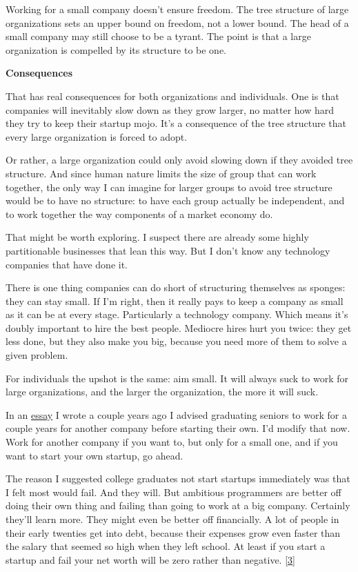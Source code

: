 Working for a small company doesn't ensure freedom. The tree structure
of large organizations sets an upper bound on freedom, not a lower
bound. The head of a small company may still choose to be a tyrant. The
point is that a large organization is compelled by its structure to be
one.

\textbf{Consequences}

That has real consequences for both organizations and individuals. One
is that companies will inevitably slow down as they grow larger, no
matter how hard they try to keep their startup mojo. It's a consequence
of the tree structure that every large organization is forced to adopt.

Or rather, a large organization could only avoid slowing down if they
avoided tree structure. And since human nature limits the size of group
that can work together, the only way I can imagine for larger groups to
avoid tree structure would be to have no structure: to have each group
actually be independent, and to work together the way components of a
market economy do.

That might be worth exploring. I suspect there are already some highly
partitionable businesses that lean this way. But I don't know any
technology companies that have done it.

There is one thing companies can do short of structuring themselves as
sponges: they can stay small. If I'm right, then it really pays to keep
a company as small as it can be at every stage. Particularly a
technology company. Which means it's doubly important to hire the best
people. Mediocre hires hurt you twice: they get less done, but they also
make you big, because you need more of them to solve a given problem.

For individuals the upshot is the same: aim small. It will always suck
to work for large organizations, and the larger the organization, the
more it will suck.

In an \href{start.html}{essay} I wrote a couple years ago I advised
graduating seniors to work for a couple years for another company before
starting their own. I'd modify that now. Work for another company if you
want to, but only for a small one, and if you want to start your own
startup, go ahead.

The reason I suggested college graduates not start startups immediately
was that I felt most would fail. And they will. But ambitious
programmers are better off doing their own thing and failing than going
to work at a big company. Certainly they'll learn more. They might even
be better off financially. A lot of people in their early twenties get
into debt, because their expenses grow even faster than the salary that
seemed so high when they left school. At least if you start a startup
and fail your net worth will be zero rather than negative.
{[}\hyperref[f3n]{3}{]}

